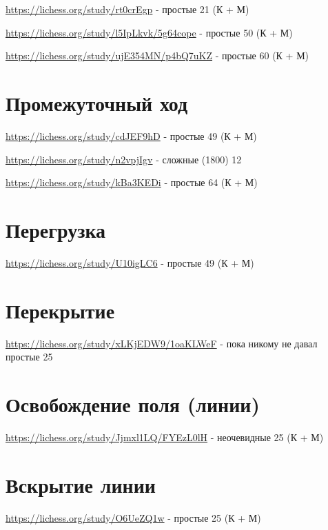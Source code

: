 \documentclass{article}
\begin{document}
\url{https://lichess.org/study/rt0crEgp} - простые 21 (К + М)

\url{https://lichess.org/study/l5IpLkvk/5g64cope} - простые 50 (К + М)

\url{https://lichess.org/study/ujE354MN/p4bQ7uKZ} - простые 60 (К + М)
\section{Промежуточный ход}
\url{https://lichess.org/study/cdJEF9hD} - простые 49 (К + М)

\url{https://lichess.org/study/n2vpjIgv} - сложные (1800) 12 

\url{https://lichess.org/study/kBa3KEDi} - простые 64 (К + М)
\section{Перегрузка}
\url{https://lichess.org/study/U10igLC6} - простые 49 (К + М)

\section{Перекрытие}
\url{https://lichess.org/study/xLKjEDW9/1oaKLWeF} - пока никому не давал
простые 25
\section{Освобождение поля (линии)}
\url{https://lichess.org/study/Jjmxl1LQ/FYEzL0lH} - неочевидные 25 (К + М)
\section{Вскрытие линии}
\url{https://lichess.org/study/O6UeZQ1w} - простые 25 (К + М)
\end{document}
